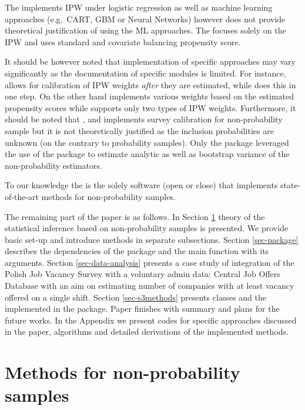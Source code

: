 \documentclass[
]{jss}
\begin{document}
The  implements IPW under logistic regression as well as
machine learning approaches (e.g.~CART, GBM or Neural Networks) however
does not provide theoretical justification of using the ML approaches.
The  focuses solely on the IPW and uses standard and
covariate balancing propensity score.

It should be however noted that implementation of specific approaches
may vary significantly as the documentation of specific modules is
limited. For instance,  allows for calibration of IPW
weights \textit{after} they are estimated, while  does
this in one step. On the other hand  implements various
weights based on the estimated propensity scores while 
supports only two types of IPW weights. Furthermore, it should be noted
that ,  and  implements survey
calibration for non-probability sample but it is not theoretically
justified as the inclusion probabilities are unknown (on the contrary to
probability samples). Only the  package leveraged the
use of the  package to estimate analytic as well as
bootstrap variance of the non-probability estimators.

To our knowledge the  is the solely software (open or
close) that implements state-of-the-art methods for non-probability
samples.

The remaining part of the paper is as follows. In Section
\ref{sec-methods} theory of the statistical inference based on
non-probability samples is presented. We provide basic set-up and
introduce methods in separate subsections. Section \ref{sec-package}
describes the dependencies of the package and the main function with its
arguments. Section \ref{sec-data-analysis} presents a case study of
integration of the Polish Job Vacancy Survey with a voluntary admin
data: Central Job Offers Database with an aim on estimating number of
companies with at least vacancy offered on a single shift. Section
\ref{sec-s3methods} presents classes and the 
implemented in the package. Paper finishes with summary and plans for
the future works. In the Appendix we present codes for specific
approaches discussed in the paper, algorithms and detailed derivations
of the implemented methods.

\section{Methods for non-probability samples}\label{sec-methods}
\end{document}
